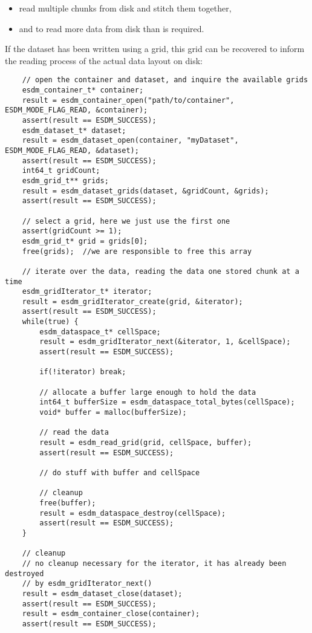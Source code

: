 \begin{itemize}
  \item read multiple chunks from disk and stitch them together,
  \item and to read more data from disk than is required.
\end{itemize}

If the dataset has been written using a grid, this grid can be recovered to inform the reading process of the actual data layout on disk:

\begin{lstlisting}
    // open the container and dataset, and inquire the available grids
    esdm_container_t* container;
    result = esdm_container_open("path/to/container", ESDM_MODE_FLAG_READ, &container);
    assert(result == ESDM_SUCCESS);
    esdm_dataset_t* dataset;
    result = esdm_dataset_open(container, "myDataset", ESDM_MODE_FLAG_READ, &dataset);
    assert(result == ESDM_SUCCESS);
    int64_t gridCount;
    esdm_grid_t** grids;
    result = esdm_dataset_grids(dataset, &gridCount, &grids);
    assert(result == ESDM_SUCCESS);

    // select a grid, here we just use the first one
    assert(gridCount >= 1);
    esdm_grid_t* grid = grids[0];
    free(grids);  //we are responsible to free this array

    // iterate over the data, reading the data one stored chunk at a time
    esdm_gridIterator_t* iterator;
    result = esdm_gridIterator_create(grid, &iterator);
    assert(result == ESDM_SUCCESS);
    while(true) {
        esdm_dataspace_t* cellSpace;
        result = esdm_gridIterator_next(&iterator, 1, &cellSpace);
        assert(result == ESDM_SUCCESS);

        if(!iterator) break;

        // allocate a buffer large enough to hold the data
        int64_t bufferSize = esdm_dataspace_total_bytes(cellSpace);
        void* buffer = malloc(bufferSize);

        // read the data
        result = esdm_read_grid(grid, cellSpace, buffer);
        assert(result == ESDM_SUCCESS);

        // do stuff with buffer and cellSpace

        // cleanup
        free(buffer);
        result = esdm_dataspace_destroy(cellSpace);
        assert(result == ESDM_SUCCESS);
    }

    // cleanup
    // no cleanup necessary for the iterator, it has already been destroyed 
    // by esdm_gridIterator_next()
    result = esdm_dataset_close(dataset);
    assert(result == ESDM_SUCCESS);
    result = esdm_container_close(container);
    assert(result == ESDM_SUCCESS);
\end{lstlisting}
